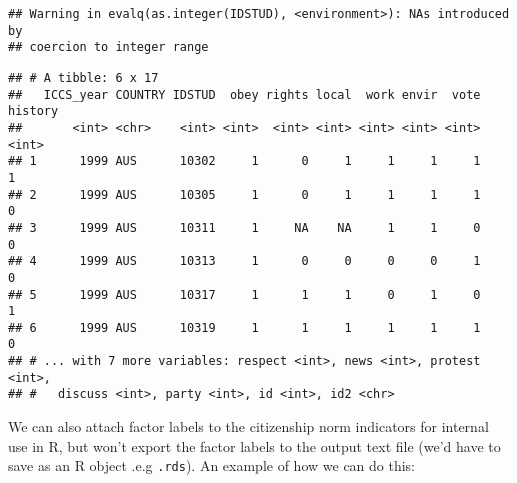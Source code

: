 \documentclass[]{article}
\newenvironment{Shaded}{\begin{snugshade}}{\end{snugshade}}
\newcommand{\CommentTok}[1]{\textcolor[rgb]{0.56,0.35,0.01}{\textit{#1}}}
\newcommand{\DataTypeTok}[1]{\textcolor[rgb]{0.13,0.29,0.53}{#1}}
\newcommand{\DecValTok}[1]{\textcolor[rgb]{0.00,0.00,0.81}{#1}}
\newcommand{\KeywordTok}[1]{\textcolor[rgb]{0.13,0.29,0.53}{\textbf{#1}}}
\newcommand{\NormalTok}[1]{#1}
\newcommand{\OperatorTok}[1]{\textcolor[rgb]{0.81,0.36,0.00}{\textbf{#1}}}
\newcommand{\StringTok}[1]{\textcolor[rgb]{0.31,0.60,0.02}{#1}}
\begin{document}
\begin{verbatim}
## Warning in evalq(as.integer(IDSTUD), <environment>): NAs introduced by
## coercion to integer range
\end{verbatim}

\begin{Shaded}
\end{Shaded}

\begin{verbatim}
## # A tibble: 6 x 17
##   ICCS_year COUNTRY IDSTUD  obey rights local  work envir  vote history
##       <int> <chr>    <int> <int>  <int> <int> <int> <int> <int>   <int>
## 1      1999 AUS      10302     1      0     1     1     1     1       1
## 2      1999 AUS      10305     1      0     1     1     1     1       0
## 3      1999 AUS      10311     1     NA    NA     1     1     0       0
## 4      1999 AUS      10313     1      0     0     0     0     1       0
## 5      1999 AUS      10317     1      1     1     0     1     0       1
## 6      1999 AUS      10319     1      1     1     1     1     1       0
## # ... with 7 more variables: respect <int>, news <int>, protest <int>,
## #   discuss <int>, party <int>, id <int>, id2 <chr>
\end{verbatim}

We can also attach factor labels to the citizenship norm indicators for
internal use in R, but won't export the factor labels to the output text
file (we'd have to save as an R object .e.g \texttt{.rds}). An example
of how we can do this:

\begin{Shaded}
\end{Shaded}
\end{document}
